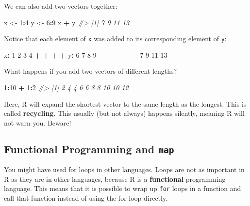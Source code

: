 \documentclass[
]{book}
\newenvironment{Shaded}{\begin{snugshade}}{\end{snugshade}}
\newcommand{\CommentTok}[1]{\textcolor[rgb]{0.56,0.35,0.01}{\textit{#1}}}
\newcommand{\DecValTok}[1]{\textcolor[rgb]{0.00,0.00,0.81}{#1}}
\newcommand{\NormalTok}[1]{#1}
\newcommand{\OperatorTok}[1]{\textcolor[rgb]{0.81,0.36,0.00}{\textbf{#1}}}
\newcommand{\StringTok}[1]{\textcolor[rgb]{0.31,0.60,0.02}{#1}}
\begin{document}
We can also add two vectors together:

\begin{Shaded}
\begin{Highlighting}[]
\NormalTok{x <-}\StringTok{ }\DecValTok{1}\OperatorTok{:}\DecValTok{4}
\NormalTok{y <-}\StringTok{ }\DecValTok{6}\OperatorTok{:}\DecValTok{9}
\NormalTok{x }\OperatorTok{+}\StringTok{ }\NormalTok{y}
\CommentTok{#> [1]  7  9 11 13}
\end{Highlighting}
\end{Shaded}

Notice that each element of \texttt{x} was added to its corresponding element of \texttt{y}:

\begin{Shaded}
\begin{Highlighting}[]
\NormalTok{x}\OperatorTok{:}\StringTok{  }\DecValTok{1}  \DecValTok{2}  \DecValTok{3}  \DecValTok{4}
    \OperatorTok{+}\StringTok{  }\OperatorTok{+}\StringTok{  }\OperatorTok{+}\StringTok{  }\OperatorTok{+}
\NormalTok{y}\OperatorTok{:}\StringTok{  }\DecValTok{6}  \DecValTok{7}  \DecValTok{8}  \DecValTok{9}
\OperatorTok{---------------}
\StringTok{    }\DecValTok{7}  \DecValTok{9} \DecValTok{11} \DecValTok{13}
\end{Highlighting}
\end{Shaded}

What happens if you add two vectors of different lengths?

\begin{Shaded}
\begin{Highlighting}[]
\DecValTok{1}\OperatorTok{:}\DecValTok{10} \OperatorTok{+}\StringTok{ }\DecValTok{1}\OperatorTok{:}\DecValTok{2}
\CommentTok{#>  [1]  2  4  4  6  6  8  8 10 10 12}
\end{Highlighting}
\end{Shaded}

Here, R will expand the shortest vector to the same length as the longest. This is called \textbf{recycling}. This usually (but not always) happens silently, meaning R will not warn you. Beware!

\hypertarget{functional-programming-and-map}{%
\subsection{\texorpdfstring{Functional Programming and \texttt{map}}{Functional Programming and map}}\label{functional-programming-and-map}}

You might have used for loops in other languages. Loops are not as important in R as they are in other languages, because R is a \textbf{functional} programming language. This means that it is possible to wrap up \texttt{for} loops in a function and call that function instead of using the for loop directly.
\end{document}
